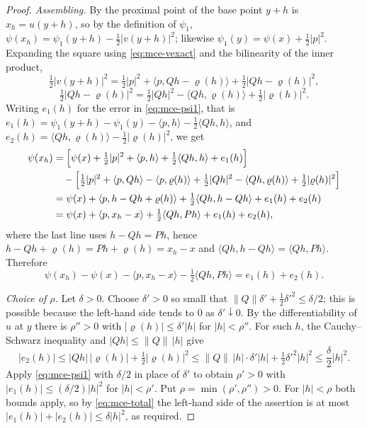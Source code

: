 \begin{proof}
\emph{Assembling.}
By  the proximal point of the base point $y+h$ is
$x_h=u(y+h)$, so by the definition of $\psi_1$,
$\psi(x_h)=\psi_1(y+h)-\tfrac12|v(y+h)|^2$; likewise
$\psi_1(y)=\psi(x)+\tfrac12|p|^2$. Expanding the square using
\eqref{eq:mce-vexact} and the bilinearity of the inner product,
\[
  \tfrac12|v(y+h)|^2
   =\tfrac12|p|^2+\langle p,Qh-\varrho(h)\rangle+\tfrac12|Qh-\varrho(h)|^2,
\]
\[
  \tfrac12|Qh-\varrho(h)|^2
   =\tfrac12|Qh|^2-\langle Qh,\varrho(h)\rangle+\tfrac12|\varrho(h)|^2 .
\]
Writing $e_1(h)$ for the error in \eqref{eq:mce-psi1}, that is
$e_1(h)=\psi_1(y+h)-\psi_1(y)-\langle p,h\rangle-\tfrac12\langle Qh,h\rangle$,
and $e_2(h)=\langle Qh,\varrho(h)\rangle-\tfrac12|\varrho(h)|^2$, we get
\[
\begin{aligned}
  \psi(x_h)&=\Bigl[\psi(x)+\tfrac12|p|^2+\langle p,h\rangle
     +\tfrac12\langle Qh,h\rangle+e_1(h)\Bigr]\\
   &\quad-\Bigl[\tfrac12|p|^2+\langle p,Qh\rangle-\langle p,\varrho(h)\rangle
     +\tfrac12|Qh|^2-\langle Qh,\varrho(h)\rangle+\tfrac12|\varrho(h)|^2\Bigr]\\
   &=\psi(x)+\langle p,h-Qh+\varrho(h)\rangle
     +\tfrac12\langle Qh,h-Qh\rangle+e_1(h)+e_2(h)\\
   &=\psi(x)+\langle p,x_h-x\rangle+\tfrac12\langle Qh,Ph\rangle+e_1(h)+e_2(h),
\end{aligned}
\]
where the last line uses $h-Qh=Ph$, hence
$h-Qh+\varrho(h)=Ph+\varrho(h)=x_h-x$ and
$\langle Qh,h-Qh\rangle=\langle Qh,Ph\rangle$. Therefore
\begin{equation}\label{eq:mce-total}
  \psi(x_h)-\psi(x)-\langle p,x_h-x\rangle-\tfrac12\langle Qh,Ph\rangle
   =e_1(h)+e_2(h).
\end{equation}

\emph{Choice of $\rho$.}
Let $\delta>0$. Choose $\delta'>0$ so small that
$\|Q\|\delta'+\tfrac12\delta'^2\le\delta/2$; this is possible because the
left-hand side tends to $0$ as $\delta'\downarrow0$. By the differentiability of
$u$ at $y$ there is $\rho''>0$ with $|\varrho(h)|\le\delta'|h|$ for $|h|<\rho''$.
For such $h$, the Cauchy--Schwarz inequality and $|Qh|\le\|Q\|\,|h|$ give
\[
  |e_2(h)|\le|Qh|\,|\varrho(h)|+\tfrac12|\varrho(h)|^2
   \le\|Q\|\,|h|\cdot\delta'|h|+\tfrac12\delta'^2|h|^2
   \le\frac{\delta}{2}|h|^2 .
\]
Apply \eqref{eq:mce-psi1} with $\delta/2$ in place of $\delta'$ to obtain
$\rho'>0$ with $|e_1(h)|\le(\delta/2)|h|^2$ for $|h|<\rho'$. Put
$\rho=\min(\rho',\rho'')>0$. For $|h|<\rho$ both bounds apply, so by
\eqref{eq:mce-total} the left-hand side of the assertion is at most
$|e_1(h)|+|e_2(h)|\le\delta|h|^2$, as required.
\end{proof}

